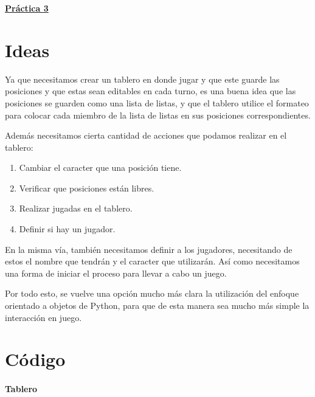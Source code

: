 



	
	\thispagestyle{encabezado}
	\pagestyle{general}
	\onehalfspacing
	
	\begin{center}
		\Huge{\underline{\textbf{Práctica 3}}}
	\end{center}
	
	\section{Ideas}
	
	Ya que necesitamos crear un tablero en donde jugar y que este guarde las posiciones y que estas sean editables en cada turno, es una buena idea que las posiciones se guarden como una lista de listas, y que el tablero utilice el formateo para colocar cada miembro de la lista de listas en sus posiciones correspondientes.
	
	Además necesitamos cierta cantidad de acciones que podamos realizar en el tablero:
	\begin{enumerate}
		\item Cambiar el caracter que una posición tiene.
		
		\item Verificar que posiciones están libres.
		
		\item Realizar jugadas en el tablero.
		
		\item Definir si hay un jugador.
	\end{enumerate}
	
	En la misma vía, también necesitamos definir a los jugadores, necesitando de estos el nombre que tendrán y el caracter que utilizarán. Así como necesitamos una forma de iniciar el proceso para llevar a cabo un juego.
	
	Por todo esto, se vuelve una opción mucho más clara la utilización del enfoque orientado a objetos de Python, para que de esta manera sea mucho más simple la interacción en juego.
	
	\section{Código}
	
	\paragraph{Tablero}
	
